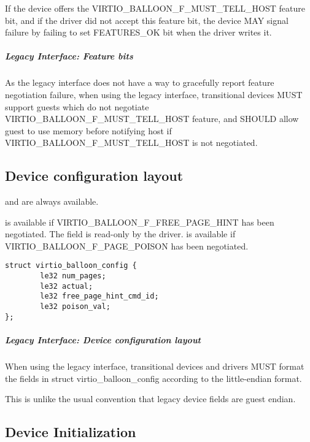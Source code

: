 If the device offers the VIRTIO_BALLOON_F_MUST_TELL_HOST feature
bit, and if the driver did not accept this feature bit, the
device MAY signal failure by failing to set FEATURES_OK
 bit when the driver writes it.
\subparagraph{Legacy Interface: Feature bits}\label{sec:Device
Types / Memory Balloon Device / Feature bits / Legacy Interface:
Feature bits}
As the legacy interface does not have a way to gracefully report feature
negotiation failure, when using the legacy interface,
transitional devices MUST support guests which do not negotiate
VIRTIO_BALLOON_F_MUST_TELL_HOST feature, and SHOULD
allow guest to use memory before notifying host if
VIRTIO_BALLOON_F_MUST_TELL_HOST is not negotiated.

\subsection{Device configuration layout}\label{sec:Device Types / Memory Balloon Device / Device configuration layout}
   and  are always available.

   is available if
    VIRTIO_BALLOON_F_FREE_PAGE_HINT has been negotiated. The field is
    read-only by the driver.
   is available if VIRTIO_BALLOON_F_PAGE_POISON has been
    negotiated.

\begin{lstlisting}
struct virtio_balloon_config {
        le32 num_pages;
        le32 actual;
        le32 free_page_hint_cmd_id;
        le32 poison_val;
};
\end{lstlisting}

\subparagraph{Legacy Interface: Device configuration layout}\label{sec:Device Types / Memory Balloon Device / Device
configuration layout / Legacy Interface: Device configuration layout}
When using the legacy interface, transitional devices and drivers
MUST format the fields in struct virtio_balloon_config
according to the little-endian format.
\begin{note}
This is unlike the usual convention that legacy device fields are guest endian.
\end{note}

\subsection{Device Initialization}\label{sec:Device Types / Memory Balloon Device / Device Initialization}

